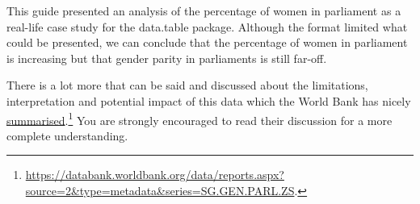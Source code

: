 \documentclass[a4paper,9pt,twocolumn,twoside,printwatermark=false]{pinp}
\begin{document}
This guide presented an analysis of the percentage of women in
parliament as a real-life case study for the data.table package.
Although the format limited what could be presented, we can conclude
that the percentage of women in parliament is increasing but that gender
parity in parliaments is still far-off.

There is a lot more that can be said and discussed about the
limitations, interpretation and potential impact of this data which the
World Bank has nicely
\href{https://databank.worldbank.org/data/reports.aspx?source=2\&type=metadata\&series=SG.GEN.PARL.ZS\#}{summarised}.\footnote{\url{https://databank.worldbank.org/data/reports.aspx?source=2\&type=metadata\&series=SG.GEN.PARL.ZS}.}
You are strongly encouraged to read their discussion for a more complete
understanding.





\end{document}
